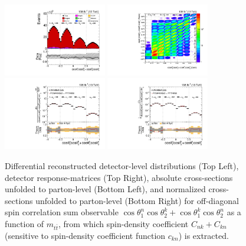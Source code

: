 \clearpage
\begin{figure}[htb]
\begin{center}
 \includegraphics[width=0.40\textwidth]{fig_fullRun2UL/controlplots/combined/Hyp_LLBarCPnk_vs_TTBarMass.pdf}
 \includegraphics[width=0.40\textwidth]{fig_fullRun2UL/unfolding/combined/ResponseMatrix_c_Pnk_mttbar.pdf} \\
 \includegraphics[width=0.40\textwidth]{fig_fullRun2UL/unfolding/combined/UnfoldedResults_c_Pnk_mttbar.pdf}
 \includegraphics[width=0.40\textwidth]{fig_fullRun2UL/unfolding/combined/UnfoldedResultsNorm_c_Pnk_mttbar.pdf} \\
\label{fig:c_Pnk_mttbar}
\caption{Differential reconstructed detector-level distributions (Top Left), detector response-matrices (Top Right), absolute cross-sections unfolded to parton-level (Bottom Left), and normalized cross-sections unfolded to parton-level (Bottom Right) for off-diagonal spin correlation sum observable $\cos\theta_{1}^{n}\cos\theta_{2}^{k}+\cos\theta_{1}^{k}\cos\theta_{2}^{n}$ as a function of $m_{t\bar{t}}$, from which spin-density coefficient $C_{nk}+C_{kn}$ (sensitive to spin-density coefficient function $c_{k n}$) is extracted.}
\end{center}
\end{figure}
